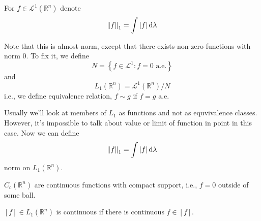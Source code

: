 	For $f\in \mathcal{L}^1(\mathbb{R}^n)$ denote
	$$\norm{f}_1 = \int \abs{f} \dd{\lambda}$$
	
	Note that this is almost norm, except that there exists non-zero functions with norm $0$. To fix it, we define
	$$N = \left\{ f\in \mathcal{L}^1 : f=0 \text{ a.e.} \right\}$$
	and
	$$L_1(\mathbb{R}^n) = \mathcal{L}^1(\mathbb{R}^n)/N$$
	i.e., we define equivalence relation, $f\sim g$ if $f=g$ a.e.
	
	Usually we'll look at members of $L_1$ as functions and not as equvivalence classes. However, it's impossible to talk about value or limit of function in point in this case. Now we can define
	$$\norm{f}_1 = \int \abs{f} \dd{\lambda}$$
	norm on $L_1(\mathbb{R}^n)$.
	
	\begin{definition}
		$C_c(\mathbb{R}^n)$ are continuous functions with compact support, i.e., $f=0$ outside of some ball.
	\end{definition}
	
	
	\begin{definition}
		$[f]\in L_1(\mathbb{R}^n)$ is continuous if there is continuous $f\in [f]$.
	\end{definition}